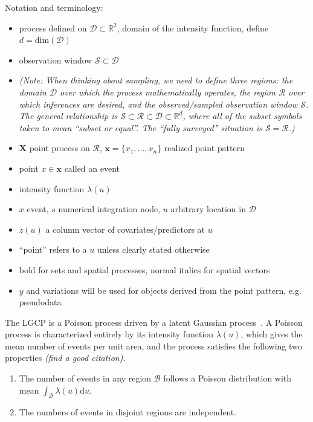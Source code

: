 \documentclass[]{interact}
\begin{document}
Notation and terminology:

\begin{itemize}

\item process defined on \(\mathcal{D} \subset \mathbb{R}^{2}\), domain of the
intensity function, define \(d = \mathrm{dim}(\mathcal{D})\)

\item observation window \(\mathcal{S} \subset \mathcal{D}\)

\item \emph{(Note: When thinking about sampling, we need to define three
regions: the domain \(\mathcal{D}\) over which the process mathematically
operates, the region \(\mathcal{R}\) over which inferences are desired, and
the observed/sampled observation window \(\mathcal{S}\). The general
relationship is \(\mathcal{S} \subset \mathcal{R} \subset \mathcal{D}
\subset \mathbb{R}^{d}\), where all of the subset symbols taken to mean
``subset or equal''. The ``fully surveyed'' situation is \(\mathcal{S}
= \mathcal{R}\).)}

\item \(\mathbf{X}\) point process on \(\mathcal{R}\),
\(\mathbf{x} = \{x_{1}, \dots, x_{n}\}\) realized point pattern

\item point \(x \in \mathbf{x}\) called an event

\item intensity function \(\lambda(u)\)

\item \(x\) event, \(s\) numerical integration node, \(u\)
arbitrary location in \(\mathcal{D}\)

\item \(z(u)\) a column vector of covariates/predictors at \(u\)

\item ``point'' refers to a \(u\) unless clearly stated otherwise

\item bold for sets and spatial processes, normal italics for spatial vectors

\item \(y\) and variations will be used for objects derived from the point
pattern, e.g. pseudodata

\end{itemize}


The LGCP is a Poisson process driven by a latent Gaussian
process~\cite{moelleretal}. A Poisson process is characterized entirely by its
intensity function \(\lambda(u)\), which gives the mean number of events
per unit area, and the process satisfies the following two properties
{\it (find a good citation)}.
\begin{enumerate}
\item The number of events in any region \(\mathcal{B}\) follows a Poisson
distribution with mean
\(\int_{\mathcal{B}} \lambda(u)\mathrm{d}u\).
\item The numbers of events in disjoint regions are independent.
\end{enumerate}
\end{document}
